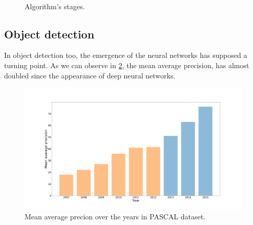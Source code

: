 \documentclass[12pt, a4paper, titlepage,twoside,openright]{article}
\begin{document}
\begin{figure}[H]
	
\centering

\\


\caption{Algorithm's stages.}
\label{stepsAlgo}
\end{figure}

\subsection{Object detection}\label{trackingBounding}






In object detection too, the emergence of the neural networks has supposed a turning point. As we can observe in \ref{deepObjet}, the mean average precision, has almost doubled since the appearance of deep neural networks.


\begin{figure}[H]
\centering         
\includegraphics[width=0.7\linewidth]{intro/objesName.png}
\caption{Mean average precion over the years in PASCAL dataset.} \label{deepObjet}
\end{figure}
\end{document}
